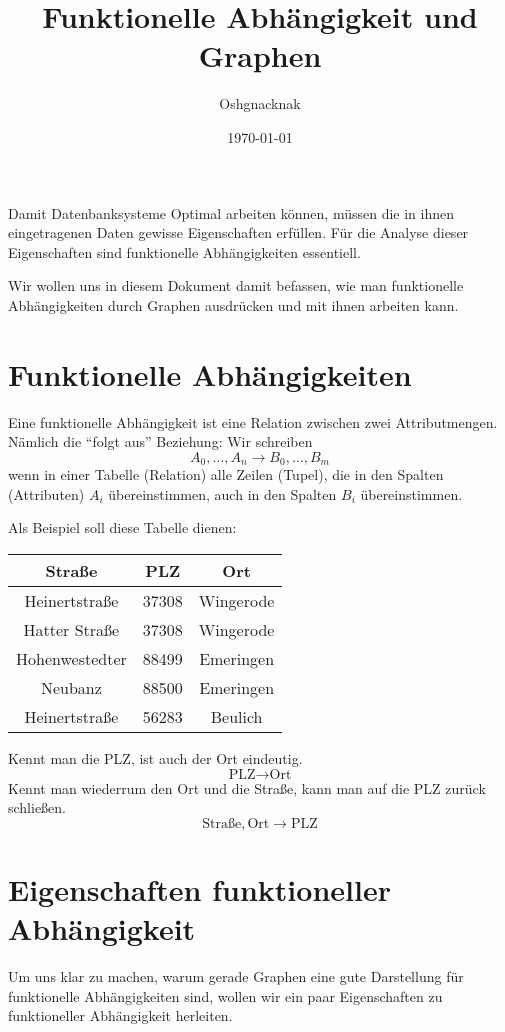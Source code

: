 \documentclass[a4paper, ngerman]{article}
\title{Funktionelle Abhängigkeit und Graphen}
\author{Oshgnacknak}
\date{\today}
\begin{document}
\maketitle

Damit Datenbanksysteme Optimal arbeiten können,
müssen die in ihnen eingetragenen Daten
gewisse Eigenschaften erfüllen.
Für die Analyse dieser Eigenschaften
sind funktionelle Abhängigkeiten essentiell.

Wir wollen uns in diesem Dokument damit befassen,
wie man funktionelle Abhängigkeiten durch Graphen ausdrücken
und mit ihnen arbeiten kann.

\section*{Funktionelle Abhängigkeiten}
Eine funktionelle Abhängigkeit
ist eine Relation zwischen zwei Attributmengen.
Nämlich die \enquote{folgt aus} Beziehung:
Wir schreiben
$$
    A_0, \dots, A_n \to 
    B_0, \dots, B_m
$$
wenn in einer Tabelle (Relation) alle Zeilen (Tupel),
die in den Spalten (Attributen) $A_i$ übereinstimmen,
auch in den Spalten $B_i$ übereinstimmen.

Als Beispiel soll diese Tabelle dienen:
\begin{center}
\begin{tabular}{ c | c | c }
    Straße & PLZ & Ort \\
    \hline
    Heinertstraße & 37308 & Wingerode \\
    Hatter Straße & 37308 & Wingerode \\
    Hohenwestedter & 88499 & Emeringen \\
    Neubanz & 88500 & Emeringen \\
    Heinertstraße & 56283 & Beulich \\
\end{tabular}
\end{center}
Kennt man die PLZ, ist auch der Ort eindeutig.
$$
    \text{PLZ} \to \text{Ort}
$$
Kennt man wiederrum den Ort und die Straße,
kann man auf die PLZ zurück schließen.
$$
    \text{Straße}, \text{Ort} \to \text{PLZ}
$$

\section*{Eigenschaften funktioneller Abhängigkeit}
Um uns klar zu machen,
warum gerade Graphen eine gute Darstellung für
funktionelle Abhängigkeiten sind,
wollen wir ein paar Eigenschaften zu
funktioneller Abhängigkeit herleiten.
\end{document}
